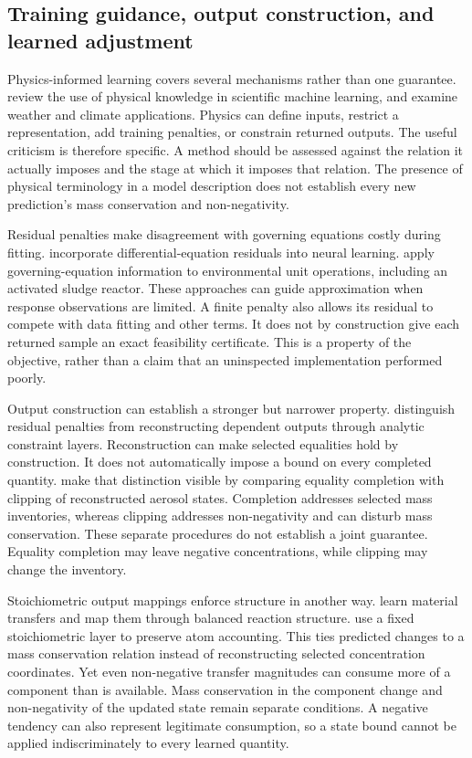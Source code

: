 \subsection{Training guidance, output construction, and learned adjustment}

Physics-informed learning covers several mechanisms rather than one guarantee. \citet{Karniadakis2021} review the use of physical knowledge in scientific machine learning, and \citet{Kashinath2021} examine weather and climate applications. Physics can define inputs, restrict a representation, add training penalties, or constrain returned outputs. The useful criticism is therefore specific. A method should be assessed against the relation it actually imposes and the stage at which it imposes that relation. The presence of physical terminology in a model description does not establish every new prediction's mass conservation and non-negativity.

Residual penalties make disagreement with governing equations costly during fitting. \citet{Raissi2019} incorporate differential-equation residuals into neural learning. \citet{Li2024} apply governing-equation information to environmental unit operations, including an activated sludge reactor. These approaches can guide approximation when response observations are limited. A finite penalty also allows its residual to compete with data fitting and other terms. It does not by construction give each returned sample an exact feasibility certificate. This is a property of the objective, rather than a claim that an uninspected implementation performed poorly.

Output construction can establish a stronger but narrower property. \citet{Beucler2021} distinguish residual penalties from reconstructing dependent outputs through analytic constraint layers. Reconstruction can make selected equalities hold by construction. It does not automatically impose a bound on every completed quantity. \citet{Harder2022} make that distinction visible by comparing equality completion with clipping of reconstructed aerosol states. Completion addresses selected mass inventories, whereas clipping addresses non-negativity and can disturb mass conservation. These separate procedures do not establish a joint guarantee. Equality completion may leave negative concentrations, while clipping may change the inventory.

Stoichiometric output mappings enforce structure in another way. \citet{SturmWexler2020} learn material transfers and map them through balanced reaction structure. \citet{SturmWexler2022} use a fixed stoichiometric layer to preserve atom accounting. This ties predicted changes to a mass conservation relation instead of reconstructing selected concentration coordinates. Yet even non-negative transfer magnitudes can consume more of a component than is available. Mass conservation in the component change and non-negativity of the updated state remain separate conditions. A negative tendency can also represent legitimate consumption, so a state bound cannot be applied indiscriminately to every learned quantity.


